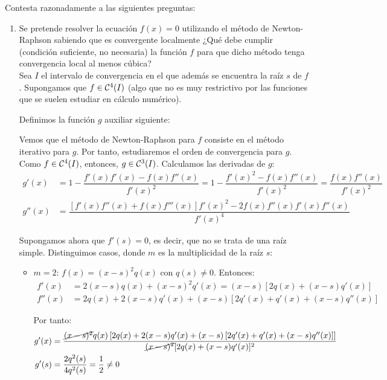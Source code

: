 \begin{ejercicio}
    Contesta razonadamente a las siguientes preguntas:
    \begin{enumerate}
        \item Se pretende resolver la ecuación $f(x) = 0$ utilizando el método de Newton-Raphson sabiendo que es convergente localmente ¿Qué debe cumplir (condición suficiente, no necesaria) la función $f$ para que dicho método tenga convergencia local al menos cúbica?\\

        Sea $I$ el intervalo de convergencia en el que además se encuentra la raíz $s$ de $f$. Supongamos que $f\in \mathcal{C}^4(I)$ (algo que no es muy restrictivo por las funciones que se suelen estudiar en cálculo numérico).        

        Definimos la función $g$ auxiliar siguiente:

        Vemos que el método de Newton-Raphson para $f$ consiste en el método iterativo para $g$. Por tanto, estudiaremos el orden de convergencia para $g$. Como $f\in \mathcal{C}^4(I)$, entonces, $g\in \mathcal{C}^3(I)$.
        Calculamos las derivadas de $g$:
        \begin{align*}
            g'(x) &= 1 - \dfrac{f'(x)f'(x) - f(x)f''(x)}{f'(x)^2} = 1-\dfrac{f'(x)^2-f(x)f''(x)}{f'(x)^2} = \dfrac{f(x)f''(x)}{f'(x)^2}\\
            g''(x) &= \dfrac{[f'(x)f''(x)+f(x)f'''(x)]f'(x)^2 - 2f(x)f''(x)f'(x)f''(x)}{f'(x)^4}
        \end{align*}

        Supongamos ahora que $f'(s)=0$, es decir, que no se trata de una raíz simple. Distinguimos casos, donde $m$ es la multiplicidad de la raíz $s$:
        \begin{itemize}
            \item \ul{$m=2$}: $f(x)=(x-s)^2q(x)$ con $q(s)\neq 0$. Entonces:
            \begin{align*}
                f'(x) &= 2(x-s)q(x) + (x-s)^2q'(x) = (x-s)[2q(x)+(x-s)q'(x)]\\
                f''(x) &= 2q(x) + 2(x-s)q'(x) + (x-s)\left[2q'(x)+q'(x)+(x-s)q''(x)\right]
            \end{align*}

            Por tanto:
            \begin{align*}
                g'(x) &= \dfrac{\cancel{(x-s)^2}q(x)\left[2q(x) + 2(x-s)q'(x) + (x-s)\left[2q'(x)+q'(x)+(x-s)q''(x)\right]\right]}{\cancel{(x-s)^2}[2q(x)+(x-s)q'(x)]^2}\\
                g'(s) &= \dfrac{2q^2(s)}{4q^2(s)} = \dfrac{1}{2}\neq 0
            \end{align*}


\end{itemize}
\end{enumerate}
\end{ejercicio}
